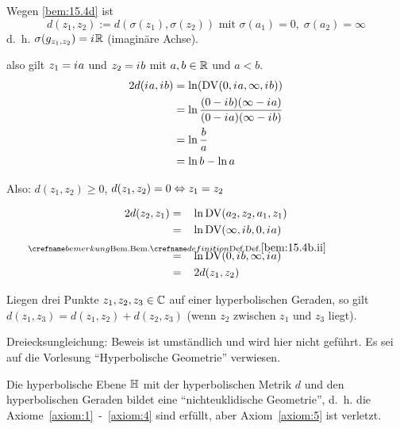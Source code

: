 \begin{beweis}
    Wegen \cref{bem:15.4d} ist
        \[d(z_1, z_2) := d(\sigma(z_1), \sigma(z_2)) \text{ mit } \sigma(a_1) = 0,\; \sigma(a_2) = \infty\]
    d.~h. $\sigma(g_{z_1, z_2}) = {i\mkern1mu} \mathbb{R}$ (imaginäre Achse).

    also gilt \obda $z_1 = {i\mkern1mu} a$ und $z_2 = {i\mkern1mu} b$ mit $a,b \in \mathbb{R}$ und $a < b$.
    \begin{align*}
        2d({i\mkern1mu} a, {i\mkern1mu} b) &= \ln(\operatorname{DV}(0, {i\mkern1mu} a, \infty, {i\mkern1mu} b))\\
                        &= \ln \frac{(0 - {i\mkern1mu} b) (\infty - {i\mkern1mu} a)}{(0 - {i\mkern1mu} a)(\infty - {i\mkern1mu} b)}\\
                        &= \ln \frac{b}{a}\\
                        &= \ln b - \ln a
    \end{align*}

    Also: $d(z_1, z_2) \geq 0$, $d(z_1, z_2) = 0 \Leftrightarrow z_1 = z_2$

    \begin{align*}
        2 d(z_2, z_1) &=\hspace{3mm}\ln \DV(a_2, z_2, a_1, z_1)\\
            &=\hspace{3mm} \ln \DV(\infty, \iu b, 0, \iu a)\\
            &\overset{\mathclap{\crefabbr{bem:15.4b.ii}}}{=}\hspace{3mm} \ln \DV(0, \iu b, \infty, \iu a)\\
            &=\hspace{3mm} 2 d(z_1, z_2)
    \end{align*}

    Liegen drei Punkte $z_1, z_2, z_3 \in \mathbb{C}$ auf einer hyperbolischen
    Geraden, so gilt $d(z_1, z_3) = d(z_1, z_2) + d(z_2, z_3)$
    (wenn $z_2$ zwischen $z_1$ und $z_3$ liegt).

    Dreiecksungleichung: Beweis ist umständlich und wird hier nicht geführt. Es sei auf die Vorlesung \enquote{Hyperbolische Geometrie}
    verwiesen.
\end{beweis}

\begin{satz}%
    Die hyperbolische Ebene $\mathbb{H}$ mit der hyperbolischen Metrik $d$
    und den hyperbolischen Geraden bildet eine \enquote{nichteuklidische Geometrie},
    d.~h. die Axiome~\ref{axiom:1}~-~\ref{axiom:4} sind erfüllt,
    aber Axiom~\ref{axiom:5} ist verletzt.
\end{satz}


